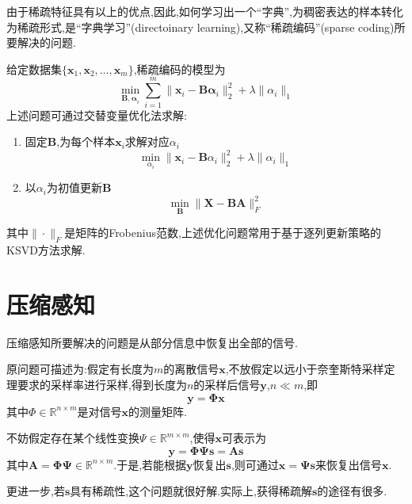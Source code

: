 由于稀疏特征具有以上的优点,因此,如何学习出一个``字典'',为稠密表达的样本转化为稀疏形式,是``字典学习''(directoinary learning),又称``稀疏编码''(sparse coding)所要解决的问题.

给定数据集$\{\mathbf{x}_1,\mathbf{x}_2,\dots,\mathbf{x}_m\}$,稀疏编码的模型为
\begin{equation}
\min_{\mathbf{B,\alpha}_i}\sum_{i=1}^m\|\mathbf{x}_i-\mathbf{B\alpha}_i\|_2^2+\lambda\|\alpha_i\|_1
\end{equation}
上述问题可通过交替变量优化法求解:
\begin{enumerate}
\item 固定$\mathbf{B}$,为每个样本$\mathbf{x}_i$求解对应$\alpha_i$
    \begin{equation}
    \min_{\alpha_i}\|\mathbf{x}_i-\mathbf{B}\alpha_i\|_2^2+\lambda\|\alpha_i\|_1
    \end{equation}
\item 以$\alpha_i$为初值更新$\mathbf{B}$
    \begin{equation}
    \min_{\mathbf{B}}\|\mathbf{X-BA}\|_F^2
    \end{equation}
\end{enumerate}
其中$\|\cdot\|_F$是矩阵的Frobenius范数,上述优化问题常用于基于逐列更新策略的KSVD方法求解.

\section{压缩感知}

压缩感知所要解决的问题是从部分信息中恢复出全部的信号.

原问题可描述为:假定有长度为$m$的离散信号$\mathbf{x}$,不放假定以远小于奈奎斯特采样定理要求的采样率进行采样,得到长度为$n$的采样后信号$\mathbf{y}$,$n\ll m$,即
\begin{equation}
\mathbf{y=\Phi x}
\end{equation}
其中$\Phi\in \mathbb{R}^{n\times m}$是对信号$\mathbf{x}$的测量矩阵.

不妨假定存在某个线性变换$\Psi\in\mathbb{R}^{m\times m}$,使得$\mathbf{x}$可表示为
\begin{equation}
\mathbf{y=\Phi\Psi s=As}
\end{equation}
其中$\mathbf{A=\Phi\Psi}\in\mathbb{R}^{n\times m}$.于是,若能根据$\mathbf{y}$恢复出$\mathbf{s}$,则可通过$\mathbf{x=\Psi s}$来恢复出信号$\mathbf{x}$.

更进一步,若$\mathbf{s}$具有稀疏性,这个问题就很好解.实际上,获得稀疏解$\mathbf{s}$的途径有很多.


